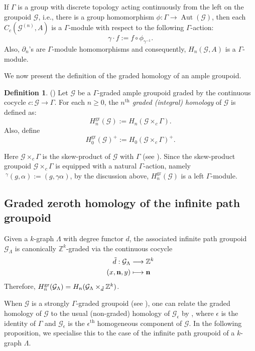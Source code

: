 \documentclass[12pt]{amsart}
\newcommand{\N}{\mathbf{n}}
\theoremstyle{definition}
\newtheorem{dfn}[thm]{Definition}
\theoremstyle{remark}
\newcommand{\Aut}{\operatorname{Aut}}
\newcommand{\gr}{\operatorname{gr}}
\begin{document}
If $\Gamma$ is a group with discrete topology acting continuously from the left on the groupoid $\mathcal{G}$, i.e., there is a group homomorphism $\phi:\Gamma\longrightarrow \Aut(\mathcal{G})$, then each $C_c(\mathcal{G}^{(n)},A)$ is a $\Gamma$-module with respect to the following $\Gamma$-action: \[\gamma\cdot f:=f\circ \phi_{\gamma^{-1}}.\] Also, $\partial_n$'s are $\Gamma$-module homomorphisms and consequently, $H_n(\mathcal{G},A)$ is a $\Gamma$-module. 

We now present the definition of the graded homology of an ample groupoid.
\begin{dfn}\label{def graded homology}
(\cite[Definition 5.3]{H-Li}) Let $\mathcal{G}$ be a $\Gamma$-graded ample groupoid graded by the continuous cocycle $c:\mathcal{G}\longrightarrow \Gamma$. For each $n\ge 0$, the \emph{$n^{\text{th}}$ graded (integral) homology} of $\mathcal{G}$ is defined as: \[H_n^{\gr}(\mathcal{G}):=H_n(\mathcal{G}\times_c \Gamma).\] Also, define \[H_0^{\gr}(\mathcal{G})^+:=H_0(\mathcal{G}\times_c \Gamma)^+.\] 
\end{dfn}
Here $\mathcal{G}\times_c \Gamma$ is the skew-product of $\mathcal{G}$ with $\Gamma$ (see \cite[Definition 1.6]{Renault}). Since the skew-product groupoid $\mathcal{G}\times_c \Gamma$ is equipped with a natural $\Gamma$-action, namely $~^\gamma (g,\alpha):=(g,\gamma\alpha)$, by the discussion above, $H_n^{\gr}(\mathcal{G})$ is a left $\Gamma$-module. 

\subsection{Graded zeroth homology of the infinite path groupoid}\label{ssec homology of path groupoid}
Given a $k$-graph $\Lambda$ with degree functor $d$, the associated infinite path groupoid $\mathcal{G}_\Lambda$ is canonically $\mathbb{Z}^k$-graded via the continuous cocycle 
\begin{align*}
\Tilde{d}:\mathcal{G}_\Lambda &\longrightarrow \mathbb{Z}^k\\
(x,\N,y) &\longmapsto \N
\end{align*}
Therefore, $H_n^{\gr}(\mathcal{G}_\Lambda)=H_n(\mathcal{G}_\Lambda\times_{\Tilde{d}} \mathbb{Z}^k)$. 

When $\mathcal{G}$ is a strongly $\Gamma$-graded groupoid (see \cite{H-Li}), one can relate the graded homology of $\mathcal{G}$ to the usual (non-graded) homology of $\mathcal{G}_\epsilon$ by \cite[Theorem 5.4]{H-Li}, where $\epsilon$ is the identity of $\Gamma$ and $\mathcal{G}_\epsilon$ is the $\epsilon^{\text{th}}$ homogeneous component of $\mathcal{G}$. In the following proposition, we specialise this to the case of the infinite path groupoid of a $k$-graph $\Lambda$. 
\end{document}
